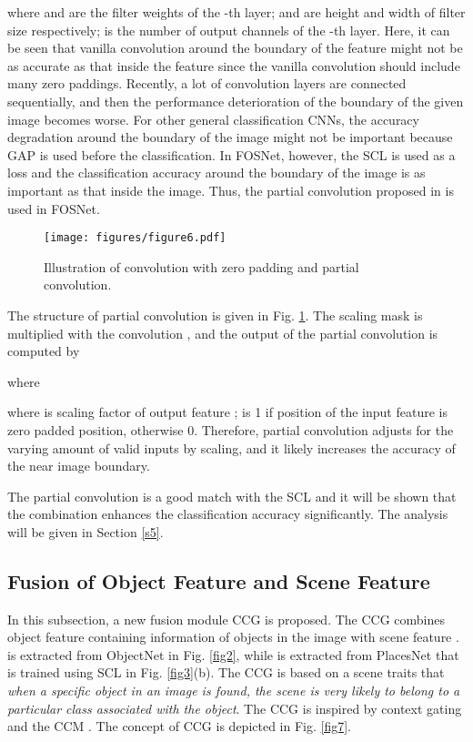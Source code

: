 \documentclass[journal,comsoc]{IEEEtran}
\begin{document}
where  and  are the filter weights of the -th layer;  and  are height and width of filter size respectively;  is the number of output channels of the -th layer. Here, it can be seen that vanilla convolution  around the boundary of the feature might not be as accurate as that inside the feature since the vanilla convolution should include many zero paddings. Recently, a lot of convolution layers are connected sequentially, and then the performance deterioration of the boundary of the given image becomes worse. For other general classification CNNs, the accuracy degradation around the boundary of the image might not be important because GAP is used before the classification. In FOSNet, however, the SCL is used as a loss and the classification accuracy around the boundary of the image is as important as that inside the image. Thus, the partial convolution proposed in \cite{b24} is used in FOSNet.


\begin{figure}[!t]
\centering
\texttt{[image: figures/figure6.pdf]}
\caption{Illustration of convolution with zero padding and partial convolution.}
\label{fig6}
\end{figure}

The structure of partial convolution \cite{b24} is given in Fig. \ref{fig6}. The scaling mask  is multiplied with the convolution , and the output of the partial convolution is computed by 

where


where  is scaling factor of output feature ;  is 1 if position  of the input feature  is zero padded position, otherwise 0. Therefore, partial convolution adjusts for the varying amount of valid inputs by scaling, and it likely increases the accuracy of the near image boundary.

The partial convolution is a good match with the SCL and it will be shown that the combination enhances the classification accuracy significantly. The analysis will be given in Section \ref{s5}. 


\subsection{Fusion of Object Feature and Scene Feature}
\label{s33}

In this subsection, a new fusion module CCG is proposed. The CCG combines object feature  containing information of objects in the image with scene feature .  is extracted from ObjectNet in Fig. \ref{fig2}, while  is extracted from PlacesNet that is trained using SCL in Fig. \ref{fig3}(b). The CCG is based on a scene traits that \textit{when a specific object in an image is found, the scene is very likely to belong to a particular class associated with the object}. The CCG is inspired by context gating \cite{b22} and the CCM \cite{b21}. The concept of CCG is depicted in Fig. \ref{fig7}.
\end{document}
